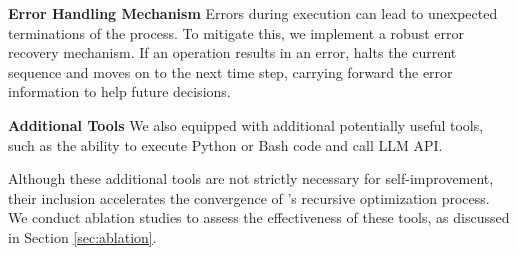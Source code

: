 \noindent\textbf{Error Handling Mechanism} \quad
Errors during execution can lead to unexpected terminations of the process. To mitigate this, we implement a robust error recovery mechanism. If an operation results in an error, \framework halts the current sequence and moves on to the next time step, carrying forward the error information to help future decisions.

\noindent\textbf{Additional Tools} \quad
We also equipped \framework with additional potentially useful tools, such as the ability to execute Python or Bash code and call LLM API. 

Although these additional tools are not strictly necessary for self-improvement, their inclusion accelerates the convergence of \framework’s recursive optimization process. We conduct ablation studies to assess the effectiveness of these tools, as discussed in Section \ref{sec:ablation}.






